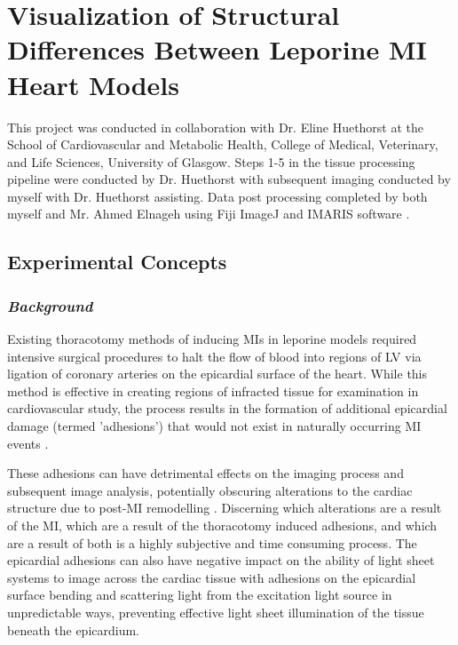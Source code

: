 \section{Visualization of Structural Differences Between Leporine MI Heart Models}

This project was conducted in collaboration with Dr. Eline Huethorst at the School of Cardiovascular and Metabolic Health, College of Medical, Veterinary, and Life Sciences, University of Glasgow. Steps 1-5 in the tissue processing pipeline were conducted by Dr. Huethorst with subsequent imaging conducted by myself with Dr. Huethorst assisting. Data post processing completed by both myself and Mr. Ahmed Elnageh using Fiji ImageJ and IMARIS software \cite{schindelin_fiji_2012, rridscr_007370_imaris_nodate}. 


\subsection{Experimental Concepts}
\subsubsection{\textit{Background}}

Existing thoracotomy methods of inducing MIs in leporine models required intensive surgical procedures to halt the flow of blood into regions of LV via ligation of coronary arteries on the epicardial surface of the heart. While this method is effective in creating regions of infracted tissue for examination in cardiovascular study, the process results in the formation of additional epicardial damage (termed 'adhesions') that would not exist in naturally occurring MI events \cite{connors_postoperative_2007, freeman_novel_2024}. 

These adhesions can have detrimental effects on the imaging process and subsequent image analysis, potentially obscuring alterations to the cardiac structure due to post-MI remodelling \cite{connors_postoperative_2007}. Discerning which alterations are a result of the MI, which are a result of the thoracotomy induced adhesions, and which are a result of both is a highly subjective and time consuming process. The epicardial adhesions can also have negative impact on the ability of light sheet systems to image across the cardiac tissue with adhesions on the epicardial surface bending and scattering light from the excitation light source in unpredictable ways, preventing effective light sheet illumination of the tissue beneath the epicardium. 

